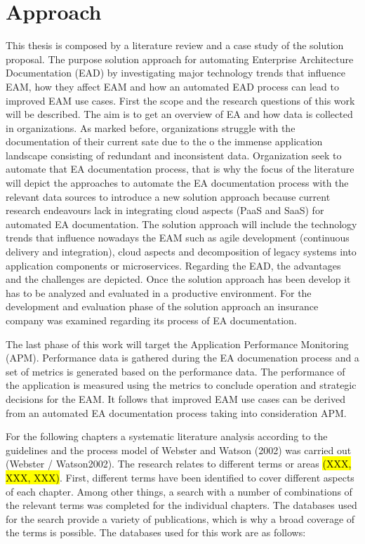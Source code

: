 \section{Approach}
This thesis is composed by a literature review and a case study of the solution proposal. The purpose solution approach for automating Enterprise Architecture Documentation (EAD) by investigating major technology trends that influence EAM, how they affect EAM and how an automated EAD process can lead to improved EAM use cases.
First the scope and the research questions of this work will be described. The aim is to get an overview of EA and how data is collected in organizations. As marked before, organizations struggle with the documentation of their current sate due to the o the immense application landscape consisting of redundant and inconsistent data. Organization seek to automate that EA documentation process, that is why the focus of the literature will depict the approaches to automate the EA documentation process with the relevant data sources to introduce a new solution approach because current research endeavours lack in integrating cloud aspects (PaaS and SaaS) for automated EA documentation. The solution approach will include the technology trends that influence nowadays the EAM such as agile development (continuous delivery and integration), cloud aspects and decomposition of legacy systems into application components or microservices. Regarding the EAD, the advantages and the challenges are depicted. Once the solution approach has been develop it has to be analyzed and evaluated in a productive environment. For the development and evaluation phase of the solution approach an insurance company was examined regarding its process of EA documentation.

The last phase of this work will target the Application Performance Monitoring (APM). Performance data is gathered during the EA documenation process and a set of metrics is generated based on the performance data. The performance of the application is measured using the metrics to conclude operation and strategic decisions for the EAM. It follows that improved EAM use cases can be derived from an automated EA documentation process taking into consideration APM.

For the following chapters a systematic literature analysis according to the guidelines and the process model of Webster and Watson (2002) was carried out (Webster / Watson2002). The research relates to different terms or areas \hl{(XXX, XXX, XXX)}. First, different terms have been identified to cover different aspects of each chapter. Among other things, a search with a number of combinations of the relevant terms was completed for the individual chapters.
The databases used for the search provide a variety of publications, which is why a broad coverage of the terms is possible. The databases used for this work are as follows:

